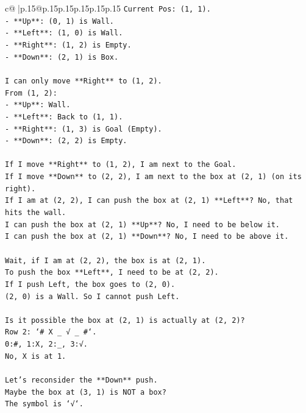 \documentclass{article}
\begin{document}
{\begin{supertabular}{c@{$\;$}|p{.15\linewidth}@{}p{.15\linewidth}p{.15\linewidth}p{.15\linewidth}p{.15\linewidth}p{.15\linewidth}}
{{{\texttt{Current Pos: (1, 1).} \\
\texttt{{-} **Up**: (0, 1) is Wall.} \\
\texttt{{-} **Left**: (1, 0) is Wall.} \\
\texttt{{-} **Right**: (1, 2) is Empty.} \\
\texttt{{-} **Down**: (2, 1) is Box.} \\
\\ 
\texttt{I can only move **Right** to (1, 2).} \\
\texttt{From (1, 2):} \\
\texttt{{-} **Up**: Wall.} \\
\texttt{{-} **Left**: Back to (1, 1).} \\
\texttt{{-} **Right**: (1, 3) is Goal (Empty).} \\
\texttt{{-} **Down**: (2, 2) is Empty.} \\
\\ 
\texttt{If I move **Right** to (1, 2), I am next to the Goal.} \\
\texttt{If I move **Down** to (2, 2), I am next to the box at (2, 1) (on its right).} \\
\texttt{If I am at (2, 2), I can push the box at (2, 1) **Left**? No, that hits the wall.} \\
\texttt{I can push the box at (2, 1) **Up**? No, I need to be below it.} \\
\texttt{I can push the box at (2, 1) **Down**? No, I need to be above it.} \\
\\ 
\texttt{Wait, if I am at (2, 2), the box is at (2, 1).} \\
\texttt{To push the box **Left**, I need to be at (2, 2).} \\
\texttt{If I push Left, the box goes to (2, 0).} \\
\texttt{(2, 0) is a Wall. So I cannot push Left.} \\
\\ 
\texttt{Is it possible the box at (2, 1) is actually at (2, 2)?} \\
\texttt{Row 2: `\# X \_ √ \_ \#`.} \\
\texttt{0:\#, 1:X, 2:\_, 3:√.} \\
\texttt{No, X is at 1.} \\
\\ 
\texttt{Let's reconsider the **Down** push.} \\
\texttt{Maybe the box at (3, 1) is NOT a box?} \\
\texttt{The symbol is `√`.} \\
}}}
\end{supertabular}}
\end{document}
